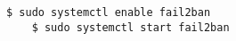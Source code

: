 \begin{lstlisting}[language=term,caption=Starten von fail2ban,label=fail2ban-ssh]
    $ sudo systemctl enable fail2ban
    $ sudo systemctl start fail2ban
\end{lstlisting}